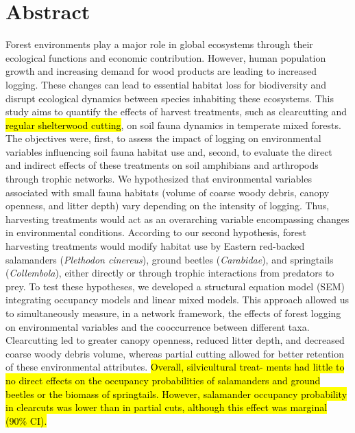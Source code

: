 \chapter*{Abstract}             %
\label{chap-abstract}           %

Forest environments play a major role in global ecosystems through their ecological functions and economic contribution. 
However, human population growth and increasing demand for wood products are leading to increased logging. 
These changes can lead to essential habitat loss for biodiversity and disrupt ecological dynamics between species inhabiting these ecosystems. 
This study aims to quantify the effects of harvest treatments, such as clearcutting and \hl{regular shelterwood cutting}, on soil fauna dynamics in temperate mixed forests. 
The objectives were, first, to assess the impact of logging on environmental variables influencing soil fauna habitat use and, second, 
to evaluate the direct and indirect effects of these treatments on soil amphibians and arthropods through trophic networks. 
We hypothesized that environmental variables associated with small fauna habitats (volume of coarse woody debris, canopy openness, and litter depth) vary depending on the intensity of logging. 
Thus, harvesting treatments would act as an overarching variable encompassing changes in environmental conditions. 
According to our second hypothesis, forest harvesting treatments would modify habitat use by Eastern red-backed salamanders (\textit{Plethodon cinereus}), ground beetles (\textit{Carabidae}), and springtails (\textit{Collembola}), 
either directly or through trophic interactions from predators to prey. 
To test these hypotheses, we developed a structural equation model (SEM) integrating occupancy models and linear mixed models. 
This approach allowed us to simultaneously measure, in a network framework, the effects of forest logging on environmental variables and the cooccurrence between different taxa. 
Clearcutting led to greater canopy openness, reduced litter depth, and decreased coarse woody debris volume,  
whereas partial cutting allowed for better retention of these environmental attributes. 
\hl{Overall, silvicultural treat- ments had little to no direct effects on the occupancy probabilities of salamanders and ground beetles or the biomass of springtails. 
However, salamander occupancy probability in clearcuts was lower than in partial cuts, although this effect was marginal (90\% CI).}
